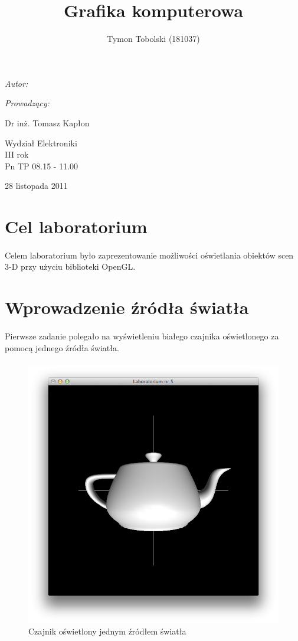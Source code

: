 \documentclass[wide,a4paper,titlepage,12pt] {article}
\title{Grafika komputerowa}
\author{Tymon Tobolski (181037)}
\makeatletter
\renewcommand{\maketitle}{
\begin{titlepage}
  \begin{center}
    \vspace*{3cm}
    \LARGE \@title \par
    \vspace{2cm}
    \textit{\small Autor:}\par
    \normalsize \@author\par \normalsize
    \vspace{3cm}
    \textit{\small Prowadzący:}\par
    Dr inż. Tomasz Kapłon \par
    \vspace{2cm}
    Wydział Elektroniki\\ III rok\\ Pn TP 08.15 - 11.00\par
    \vspace{4cm}
    \small 28 listopada 2011
  \end{center}
\end{titlepage}
}
\makeatother
\begin{document}
\maketitle
  \section{Cel laboratorium}
  \paragraph{}
  Celem laboratorium było zaprezentowanie możliwości oświetlania obiektów scen 3-D przy użyciu biblioteki OpenGL.

  \section{Wprowadzenie źródła światła}
  \paragraph{}
  Pierwsze zadanie polegało na wyświetleniu białego czajnika oświetlonego za pomocą jednego źródła światła.
  \paragraph{}
  

  \begin{figure}[h!]
    \begin{center}
      \includegraphics[width=\textwidth]{1.png}
      \caption{Czajnik oświetlony jednym źródłem światła}
    \end{center}
  \end{figure}
\end{document}

